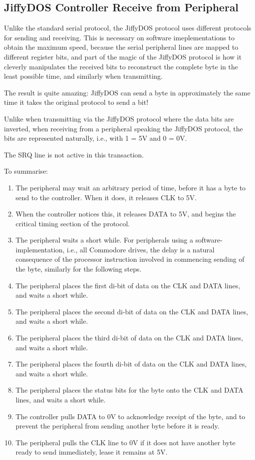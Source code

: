 \subsection{JiffyDOS{\texttrademark} Controller Receive from Peripheral}

Unlike the standard serial protocol, the JiffyDOS{\texttrademark} protocol uses
different protocols for sending and receiving. This is necessary on software
imeplementations to obtain the maximum speed, because the serial peripheral
lines are mapped to different register bits, and part of the magic of
the JiffyDOS{\texttrademark} protocol is how it cleverly manipulates
the received bits to reconstruct the complete byte in the least
possible time, and similarly when transmitting.

The result is quite amazing: JiffyDOS{\texttrademark} can send a byte
in approximately the same time it takes the original protocol to send
a bit!

Unlike when transmitting via the JiffyDOS{\texttrademark} protocol
where the data bits are inverted, when receiving from a peripheral
speaking the JiffyDOS{\texttrademark} protocol, the bits are
represented naturally, i.e., with 1 = 5V and 0 = 0V.

The SRQ line is not active in this transaction.

To summarise:

\begin{enumerate}
\item The peripheral may wait an arbitrary period of time, before it
  has a byte to send to the controller. When it does, it releases CLK
  to 5V.
\item When the controller notices this, it releases DATA to 5V, and
  begins the critical timing section of the protocol.
\item The peripheral waits a short while. For peripherals using a
  software-implementation, i.e., all Commodore{\texttrademark}
  drives, the delay is a natural consequence of the processor
  instruction involved in commencing sending of the byte,
  similarly for the following steps.
\item The peripheral places the first di-bit of data on the CLK
  and DATA lines, and waits a short while.
\item The peripheral places the second di-bit of data on the CLK
  and DATA lines, and waits a short while.
\item The peripheral places the third di-bit of data on the CLK
  and DATA lines, and waits a short while.
\item The peripheral places the fourth di-bit of data on the CLK
  and DATA lines, and waits a short while.
\item The peripheral places the status bits for the byte onto
  the CLK and DATA lines, and waits a short while.
\item The controller pulls DATA to 0V to acknowledge receipt
  of the byte, and to prevent the peripheral from sending
  another byte before it is ready.
\item The peripheral pulls the CLK line to 0V if it does not
  have another byte ready to send immediately, lease it
  remains at 5V.
\end{enumerate}

